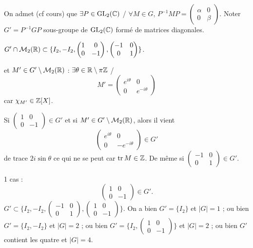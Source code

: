 \begin{solution}
On admet (cf cours) que $\exists P\in\operatorname{GL}_2(\mathbb C)$ / $\forall M\in G$,
$P^{-1}MP=\begin{pmatrix}\alpha&0\\0&\beta\end{pmatrix}$.
Noter $G'=P^{-1}GP$ sous-groupe de $\operatorname{GL}_2(\mathbb C)$ formé de matrices diagonales.

$G'\cap\mathcal M_2(\mathbb R)\subset\{I_2,-I_2,\begin{pmatrix}1&0\\0&-1\end{pmatrix},
\begin{pmatrix}-1&0\\0&1\end{pmatrix}\}$.

et $M'\in G'\setminus \mathcal M_2(\mathbb R)$ : $\exists\theta\in\mathbb R\setminus\pi\mathbb Z$ /
\[
M'=\begin{pmatrix}e^{i\theta}&0\\0&e^{-i\theta}\end{pmatrix}
\]
car $\chi_{M'}\in\mathbb Z[X]$.

Si $\begin{pmatrix}1&0\\0&-1\end{pmatrix}\in G'$ et si $M'\in G'\setminus\mathcal M_2(\mathbb R)$,
alors il vient
\[
\begin{pmatrix}e^{i\theta}&0\\0&-e^{-i\theta}\end{pmatrix}\in G'
\]
de trace $2i\sin\theta$ ce qui ne se peut car $\operatorname{tr} M\in\mathbb Z$.
De même si $\begin{pmatrix}-1&0\\0&1\end{pmatrix}\in G'$.

1\ier{} cas :
\[
\begin{pmatrix}1&0\\0&-1\end{pmatrix}\in G'.
\]
$G'\subset\{I_2,-I_2,\begin{pmatrix}-1&0\\0&1\end{pmatrix},
\begin{pmatrix}1&0\\0&-1\end{pmatrix}\}$.
On a bien $G'=\{I_2\}$ et $|G|=1$ ; ou bien $G'=\{I_2,-I_2\}$ et $|G|=2$ ;
ou bien $G'=\{I_2,\begin{pmatrix}1&0\\0&-1\end{pmatrix}\}$ et $|G|=2$ ; ou
bien $G'$ contient les quatre et $|G|=4$.


\end{solution}
